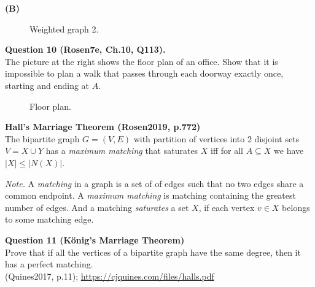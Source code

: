 \documentclass[jou]{apa6}
\begin{document}
\newpage
{\bf (B)}
\begin{figure}[!htb]
\caption{\label{fig:dijkstra-graph2} Weighted graph 2.}
\end{figure}


\vspace{10pt}
{\bf Question 10 (Rosen7e, Ch.10, Q113).}\\
The picture at the right shows the floor plan of
an office. Show that it is impossible to plan a walk that passes through
each doorway exactly once, starting and ending at $A$.
\begin{figure}[!htb]
\caption{\label{fig:floor-plan-graph} Floor plan.}
\end{figure}


\vspace{10pt}
{\bf Hall's Marriage Theorem (Rosen2019, p.772)}\\
The bipartite graph $G=(V,E)$ with partition 
of vertices into 2 disjoint sets $V = X \cup Y$ 
has a {\em maximum matching} that saturates $X$
iff for all $A \subseteq X$ we have
$|X| \leq |N(X)|$. 

{\em Note.} A {\em matching} in a graph is a set of of edges
such that no two edges share a common endpoint. 
A {\em maximum matching} is matching containing the greatest
number of edges. And a matching {\em saturates} a set $X$, 
if each vertex $v \in X$ belongs to some matching edge.

\vspace{10pt}
{\bf Question 11 (K\"{o}nig’s Marriage Theorem)}\\
Prove that if all the vertices of a bipartite graph
have the same degree, then it has a perfect matching.\\
(Quines2017, p.11); \url{https://cjquines.com/files/halls.pdf}
\end{document}
